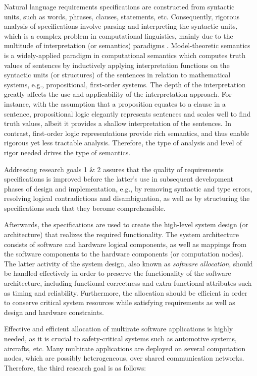 Natural language requirements specifications are constructed from syntactic units, such as words, phrases, clauses, statements, etc. Consequently, rigorous analysis of specifications involve parsing and interpreting the syntactic units, which is a complex problem in computational linguistics, mainly due to the multitude of  interpretation (or semantics) paradigms \cite{Clark2010TheProcessing}. Model-theoretic semantics is a widely-applied paradigm in computational semantics which computes truth values of sentences by inductively applying interpretation functions on the syntactic units (or structures) of the sentences in relation to mathematical systems, e.g., propositional, first-order systems. The depth of the interpretation greatly affects the use and applicability of the interpretation approach. For instance, with the assumption that a proposition equates to a clause in a sentence, propositional logic elegantly represents sentences and scales well to find truth values, albeit it provides a shallow interpretation of the sentences. In contrast, first-order logic representations provide rich semantics, and thus enable rigorous yet less tractable analysis. Therefore, the type of analysis and level of rigor needed drives the type of semantics.

Addressing research goals 1 \& 2 assures that the quality of requirements specifications is improved before the latter's use in subsequent development phases of design and implementation, e.g., by removing syntactic and type errors, resolving logical contradictions and disambiguation, as well as by structuring the specifications such that they become comprehensible. 

Afterwards, the specifications are used to create the high-level system design (or architecture) that realizes the required functionality. The system architecture consists of software and hardware logical components, as well as mappings from the software components to the hardware components (or computation nodes). The latter activity of the system design, also known as \textit{software allocation}, should be handled effectively in order to preserve the functionality of the software architecture, including functional correctness and extra-functional attributes such as timing and reliability. Furthermore, the allocation should be efficient in order to conserve critical system resources while satisfying requirements as well as design and hardware constraints.

Effective and efficient allocation of multirate software applications is highly needed, as it is crucial to safety-critical systems such as automotive systems, aircrafts, etc. Many multirate applications are deployed on several computation nodes, which are possibly heterogeneous, over shared communication networks. Therefore, the third research goal is as follows:
 
